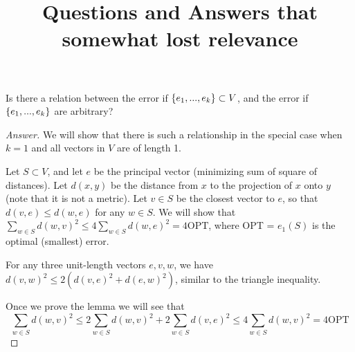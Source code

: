 \documentclass{article}
\title{Questions and Answers that somewhat lost relevance}
\begin{document}
\maketitle

\begin{question}
    Is there a relation between the error if $\left\{e_1,...,e_k\right\}\subset V$, and the error if $\left\{e_1,...,e_k\right\}$ are arbitrary?
\end{question}

\begin{proof}[Answer]\label{A: relationsip between OPT and sample representative error}
We will show that there is such a relationship in the special case when $k=1$ and all vectors in $V$ are of length 1.

Let $S\subset V$, and let $e$ be the principal vector (minimizing sum of square of distances). Let $d(x,y)$ be the distance from $x$ to the projection of $x$ onto $y$ (note that it is not a metric). Let $v\in S$ be the closest vector to $e$, so that $d(v,e)\leq d(w,e)$ for any $w\in S$. We will show that $\sum_{w\in S}d(w,v)^2\leq 4\sum_{w\in S}d(w,e)^2 = 4\text{OPT}$, where OPT = $e_1(S)$ is the optimal (smallest) error.

\begin{lemma}\label{lemma: triangle inequality for projection distance}
For any three unit-length vectors $e,v,w$, we have $d(v,w)^2\leq 2(d(v,e)^2+d(e,w)^2)$, similar to the triangle inequality.
\end{lemma}
Once we prove the lemma we will see that
\begin{equation}\label{eqn: main equation for proof in case k = 1}
    \sum_{w\in S}d(w,v)^2\leq 2\sum_{w\in S}d(w,v)^2+2\sum_{w\in S}d(v,e)^2\leq 4\sum_{w\in S}d(w,v)^2 = 4\text{OPT}
\end{equation}


\end{proof}
\end{document}
